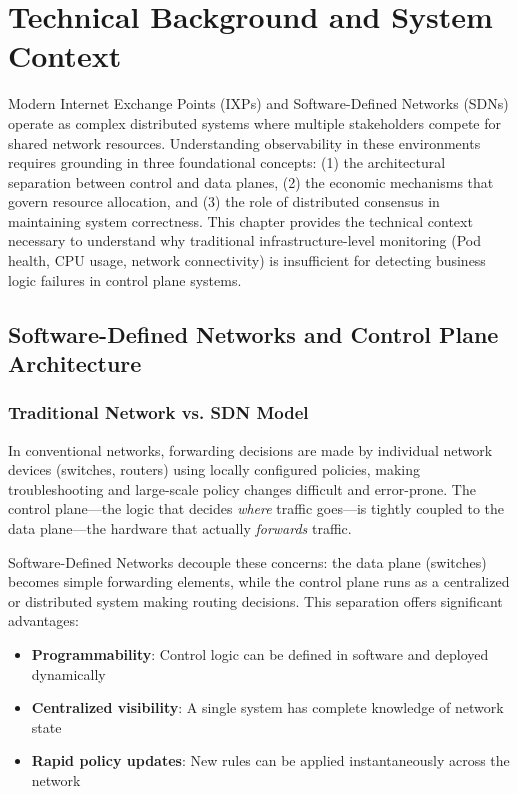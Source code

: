 \section{Technical Background and System Context}

Modern Internet Exchange Points (IXPs) and Software-Defined Networks (SDNs) operate as complex distributed systems where multiple stakeholders compete for shared network resources. Understanding observability in these environments requires grounding in three foundational concepts: (1) the architectural separation between control and data planes, (2) the economic mechanisms that govern resource allocation, and (3) the role of distributed consensus in maintaining system correctness. This chapter provides the technical context necessary to understand why traditional infrastructure-level monitoring (Pod health, CPU usage, network connectivity) is insufficient for detecting business logic failures in control plane systems.

\subsection{Software-Defined Networks and Control Plane Architecture}

\subsubsection{Traditional Network vs. SDN Model}

In conventional networks, forwarding decisions are made by individual network devices (switches, routers) using locally configured policies, making troubleshooting and large-scale policy changes difficult and error-prone. The control plane---the logic that decides \textit{where} traffic goes---is tightly coupled to the data plane---the hardware that actually \textit{forwards} traffic.

Software-Defined Networks decouple these concerns: the data plane (switches) becomes simple forwarding elements, while the control plane runs as a centralized or distributed system making routing decisions. This separation offers significant advantages:

\begin{itemize}
    \item \textbf{Programmability}: Control logic can be defined in software and deployed dynamically
    \item \textbf{Centralized visibility}: A single system has complete knowledge of network state
    \item \textbf{Rapid policy updates}: New rules can be applied instantaneously across the network
\end{itemize}

